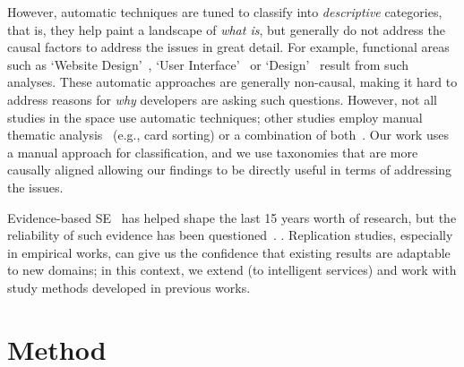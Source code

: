 However, automatic techniques are tuned to classify into \textit{descriptive} categories, that is, they help paint a landscape of \textit{what is}, but generally do not address the causal factors to address the issues in great detail. For example, functional areas such as `Website Design'~\citep{Barua:2012gz}, `User Interface'~\citep{Beyer:2014ec} or `Design'~\citep{Uddin:2015hn} result from such analyses. These automatic approaches are generally non-causal, making it hard to address reasons for \textit{why} developers are asking such questions. However, not all studies in the space use automatic techniques; other studies employ manual thematic analysis~\citep{Tahir:2018ks,Aghajani:2019bo,Barzilay:2013cn} (e.g., card sorting) or a combination of both~\citep{Beyer:2018fm,Beyer:2014ec,Rosen:2016uk,Treude:2011fh}. Our work uses a manual approach for classification, and we use taxonomies that are more causally aligned allowing our findings to be directly useful in terms of addressing the issues.

Evidence-based SE~\citep{Kitchenham:2004vj} has helped shape the last 15 years worth of research, but the reliability of such evidence has been questioned~\citep{rgensen:2016gl,Juristo:2012bp,Shepperd:2018hr}.
.
Replication studies, especially in empirical works, can give us the confidence that existing results are adaptable to new domains; in this context, we extend (to intelligent services) and work with study methods developed in previous works.

\section{Method}
\label{icse2020:sec:method}


